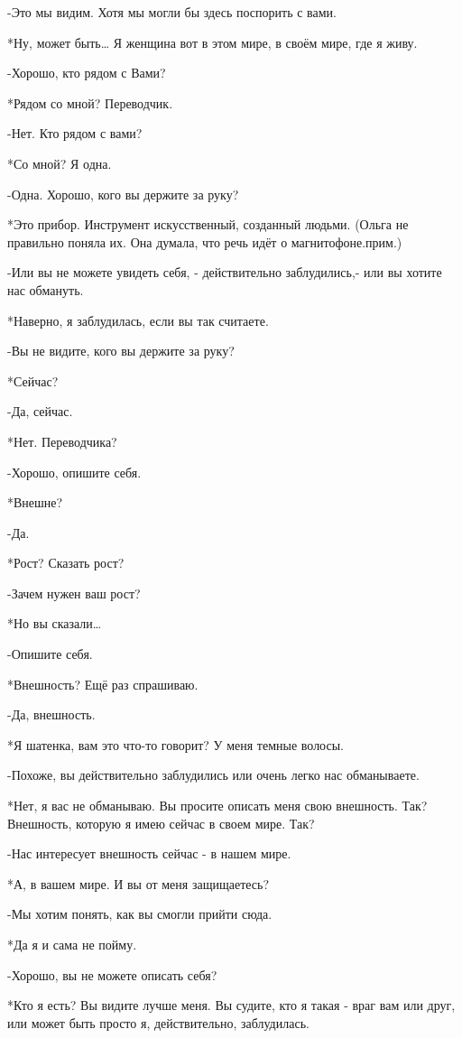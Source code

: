 -Это мы видим. Хотя мы могли бы здесь поспорить с вами.

*Ну, может быть… Я женщина вот в этом мире, в своём мире, где я живу.

-Хорошо, кто рядом с Вами?

*Рядом со мной? Переводчик.

-Нет. Кто рядом с вами?

*Со мной? Я одна.

-Одна. Хорошо, кого вы держите за руку?

*Это прибор. Инструмент искусственный, созданный людьми. 
(Ольга не правильно поняла их. Она думала, что речь идёт о магнитофоне.прим.)

-Или вы не можете увидеть себя, - действительно заблудились,- или вы хотите нас обмануть.

*Наверно, я заблудилась, если вы так считаете.

-Вы не видите, кого вы держите за руку?

*Сейчас?

-Да, сейчас.

*Нет. Переводчика?

-Хорошо, опишите себя.

*Внешне?

-Да.

*Рост? Сказать рост?

-Зачем нужен ваш рост?

*Но вы сказали…

-Опишите себя.

*Внешность? Ещё раз спрашиваю.

-Да, внешность.

*Я шатенка, вам это что-то говорит? У меня темные волосы.

-Похоже, вы действительно заблудились или очень легко нас обманываете.

*Нет, я вас не обманываю. Вы просите описать меня свою внешность. Так? Внешность, которую я имею сейчас в своем мире. Так?

-Нас интересует внешность сейчас - в нашем мире.

*А, в вашем мире. И вы от меня защищаетесь?

-Мы хотим понять, как вы смогли прийти сюда.

*Да я и сама не пойму.

-Хорошо, вы не можете описать себя?

*Кто я есть? Вы видите лучше меня. Вы судите, кто я такая -  враг вам или друг, или может быть просто я, действительно, заблудилась.

